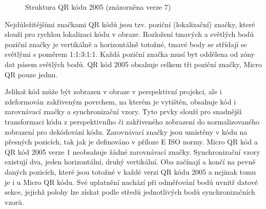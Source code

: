 \begin{figure}[H]
  \begin{center}
    \caption{Struktura QR kódu 2005 (znázorněna verze 7)}
    \label{QRCodesStructure}
  \end{center}
\end{figure}

Nejdůležitějšími značkami QR kódů jsou tzv. poziční (lokalizační) značky, které 
slouží pro rychlou lokalizaci kódu v obraze. Rozložení tmavých a světlých bodů 
poziční značky je vertikálně a horizontálně totožné, tmavé body se střídají se 
světlými s poměrem 1:1:3:1:1. Každá poziční značka musí byt oddělena od zóny dat 
pásem světlých bodů. QR kód 2005 obsahuje celkem tři poziční značky, Micro QR 
pouze jednu.

Jelikož kód může být zobrazen v obraze v perspektivní projekci, ale i 
zdeformován zakřiveným povrchem, na kterém je vytištěn, obsahuje kód i 
zarovnávací značky a synchronizační vzory. Tyto prvky slouží pro snadnější 
transformaci kódu z perspektivního či zakřiveného zobrazení do normalizovaného 
zobrazení pro dekódování kódu. Zarovnávací značky jsou umístěny v kódu na 
přesných pozicích, tak jak je definováno v příloze E ISO normy. Micro QR kód 
a QR kód 2005 verze 1 neobsahuje žádné zarovnávací značky. Synchronizační vzory
existují dva, jeden horizontální, druhý vertikální. Oba začínají a končí na
pevně daných pozicích, které jsou totožné v každé verzi QR kódu 2005 a nejinak tomu 
je i u Micro QR kódu. Své uplatnění nachází při odměřování bodů uvnitř datové 
sekce, jejichž polohy lze získat podle středů jednotlivých bodů synchronizačních
vzorů. 

